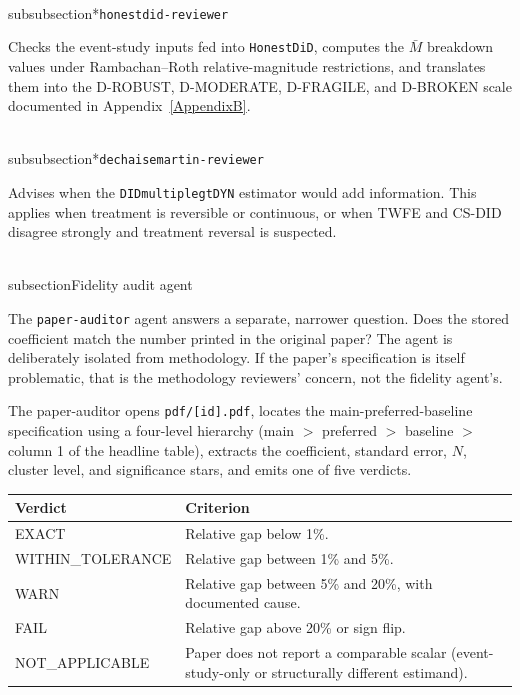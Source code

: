 \\subsubsection*{\texttt{honestdid-reviewer}}

Checks the event-study inputs fed into \texttt{HonestDiD}, computes the $\bar M$ breakdown values under Rambachan--Roth relative-magnitude restrictions, and translates them into the D-ROBUST, D-MODERATE, D-FRAGILE, and D-BROKEN scale documented in Appendix~\ref{AppendixB}.

\\subsubsection*{\texttt{dechaisemartin-reviewer}}

Advises when the \texttt{DIDmultiplegtDYN} estimator would add information. This applies when treatment is reversible or continuous, or when TWFE and CS-DID disagree strongly and treatment reversal is suspected.


\\subsection{Fidelity audit agent}
\label{sec:appc_fidelity}

The \texttt{paper-auditor} agent answers a separate, narrower question. Does the stored coefficient match the number printed in the original paper? The agent is deliberately isolated from methodology. If the paper's specification is itself problematic, that is the methodology reviewers' concern, not the fidelity agent's.

The paper-auditor opens \texttt{pdf/[id].pdf}, locates the main-preferred-baseline specification using a four-level hierarchy (main $>$ preferred $>$ baseline $>$ column 1 of the headline table), extracts the coefficient, standard error, $N$, cluster level, and significance stars, and emits one of five verdicts.

\begin{table}[H]
\centering
\footnotesize
\begin{tabularx}{\textwidth}{@{}l X@{}}
\toprule
\textbf{Verdict} & \textbf{Criterion} \\
\midrule
EXACT             & Relative gap below 1\%. \\
WITHIN\_TOLERANCE & Relative gap between 1\% and 5\%. \\
WARN              & Relative gap between 5\% and 20\%, with documented cause. \\
FAIL              & Relative gap above 20\% or sign flip. \\
NOT\_APPLICABLE   & Paper does not report a comparable scalar (event-study-only or structurally different estimand). \\
\bottomrule
\end{tabularx}
\end{table}

